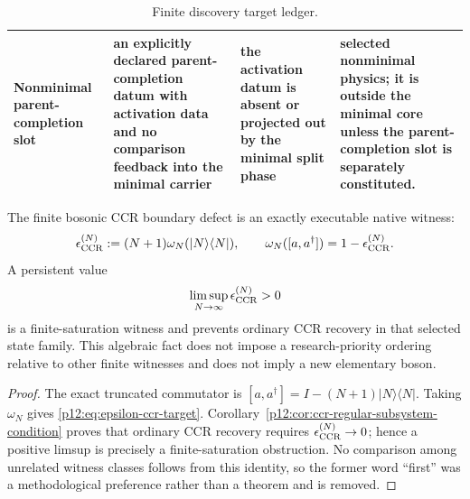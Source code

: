 \documentclass[12pt,a4paper]{article}
\begin{document}
\begin{table}[htbp]
\begin{tabularx}{\textwidth}{@{}
>{\raggedright\arraybackslash}p{}
>{\raggedright\arraybackslash}p{}
>{\raggedright\arraybackslash}p{}
>{\raggedright\arraybackslash}X
@{}}
Nonminimal parent-completion slot
& an explicitly declared parent-completion datum with activation data and no comparison feedback into the minimal carrier
& the activation datum is absent or projected out by the minimal split phase
& selected nonminimal physics; it is outside the minimal core unless the parent-completion slot is separately constituted. \\
\bottomrule
\end{tabularx}
\caption[Finite discovery target ledger]{Finite discovery target ledger.}
\label{p12:tab:finite-discovery-target-ledger}
\end{table}

\begin{proposition}
\label{p12:prop:finite-witness-target-priority}
The finite bosonic CCR boundary defect is an exactly executable native witness:
\begin{equation}
\label{p12:eq:epsilon-ccr-target}
\epsilon_{\rm CCR}^{(N)}:=(N+1)\omega_N(|N\rangle\langle N|),
\qquad
\omega_N([a,a^\dagger])=1-\epsilon_{\rm CCR}^{(N)}.
\end{equation}
A persistent value
\begin{equation}
\label{p12:eq:epsilon-ccr-nonzero}
\limsup_{N\to\infty}\epsilon_{\rm CCR}^{(N)}>0
\end{equation}
is a finite-saturation witness and prevents ordinary CCR recovery in that selected state family.  This algebraic fact does not impose a research-priority ordering relative to other finite witnesses and does not imply a new elementary boson.
\end{proposition}
\begin{proof}
The exact truncated commutator is \([a,a^\dagger]=I-(N+1)|N\rangle\langle N|\).  Taking \(\omega_N\) gives \eqref{p12:eq:epsilon-ccr-target}.  Corollary~\ref{p12:cor:ccr-regular-subsystem-condition} proves that ordinary CCR recovery requires \(\epsilon_{\rm CCR}^{(N)}\to0\); hence a positive limsup is precisely a finite-saturation obstruction.  No comparison among unrelated witness classes follows from this identity, so the former word ``first'' was a methodological preference rather than a theorem and is removed.
\end{proof}
\end{document}

